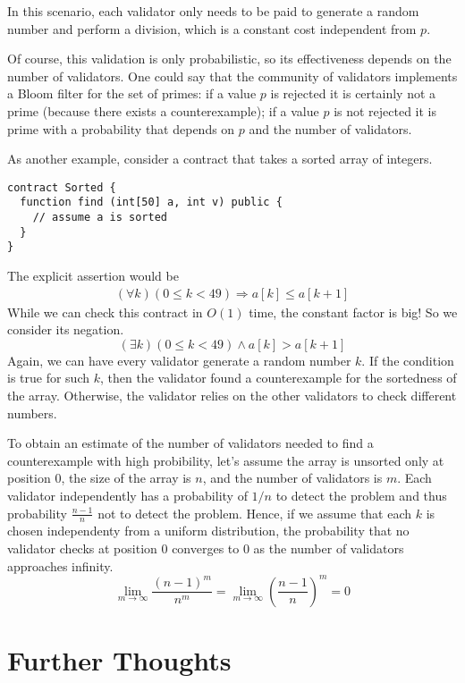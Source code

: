 \documentclass{article}
\begin{document}
In this scenario, each validator only needs to be paid to generate a random number and
perform a division, which is a constant cost independent from $p$.

Of course, this validation is only probabilistic, so its effectiveness depends on the
number of validators. One could say that the community of validators implements a Bloom
filter for the set of primes: if a value $p$ is rejected it is certainly not a prime (because
there exists a counterexample); if a value $p$ is not rejected it is prime with a
probability that depends on $p$ and the number of validators. 

As another example, consider a contract that takes a sorted array of integers.
\begin{lstlisting}[numbers=none]
contract Sorted {
  function find (int[50] a, int v) public {
    // assume a is sorted
  }
}
\end{lstlisting}
The explicit assertion would be
\begin{gather}\label{eq:1}
  (\forall k) (0\le k <49) \Rightarrow a[k] \le a[k+1]
\end{gather}
While we can check this contract in $O(1)$ time, the constant factor is big! So we
consider its negation.
\begin{displaymath}
  (\exists k) (0\le k <49) \wedge a[k] > a[k+1]
\end{displaymath}
Again, we can have every validator generate a random number $k$. If the
condition is true for such $k$, then the validator found a counterexample for the sortedness
of the array. Otherwise, the validator relies on the other validators to check
different numbers.

To obtain an estimate of the number of validators needed to find a counterexample with
high probibility, 
let's assume the array is unsorted only at position $0$, the size of the array is $n$,
and the number of validators is $m$. Each validator independently has a probability of
$1/n$ to detect the problem and thus probability $\frac{n-1} n$ not to detect the
problem. Hence, if we assume that each $k$ is chosen independenty from a uniform distribution,
the probability that no validator checks at
position $0$ converges to $0$ as the number of validators approaches infinity.
\begin{displaymath}
  \lim_{m\to\infty}\frac{(n-1)^m}{n^m}
  = \lim_{m\to\infty} \left(\frac{n-1}{n}\right)^m
  = 0
\end{displaymath}

\section{Further Thoughts}
\label{sec:further-thoughts}
\end{document}
